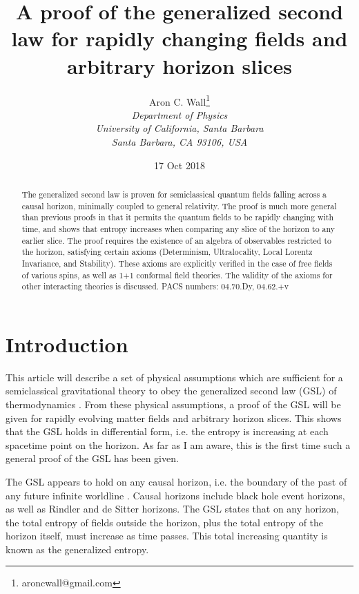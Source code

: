 \documentclass[12pt]{article}
\author{Aron C. Wall\footnote{aroncwall@gmail.com}
\\ \textit{Department of Physics} \\ \textit{University of California, Santa Barbara}
\\ \textit{Santa Barbara, CA 93106, USA} }
\title{A proof of the generalized second law for rapidly changing fields and arbitrary horizon slices}
\date{17 Oct 2018}
\begin{document}
\maketitle

\begin{abstract}
The generalized second law is proven for semiclassical quantum fields falling across a causal horizon, minimally coupled to general relativity.  The proof is much more general than previous proofs in that it permits the quantum fields to be rapidly changing with time, and shows that entropy increases when comparing any slice of the horizon to any earlier slice.  The proof requires the existence of an algebra of observables restricted to the horizon, satisfying certain axioms (Determinism, Ultralocality, Local Lorentz Invariance, and Stability).  These axioms are explicitly verified in the case of free fields of various spins, as well as 1+1 conformal field theories.  The validity of the axioms for other interacting theories is discussed.
\newline\newline
PACS numbers: 04.70.Dy, 04.62.+v
\end{abstract}

\newpage
\tableofcontents
\newpage

\section{Introduction}

This article will describe a set of physical assumptions which are sufficient for a semiclassical gravitational theory to obey the generalized second law (GSL) of thermodynamics \cite{hawking75}.  From these physical assumptions, a proof of the GSL will be given for rapidly evolving matter fields and arbitrary horizon slices.  This shows that the GSL holds in differential form, i.e. the entropy is increasing at each spacetime point on the horizon.  As far as I am aware, this is the first time such a general proof of the GSL has been given.

The GSL appears to hold on any causal horizon, i.e. the boundary of the past of any future infinite worldline \cite{JP03}.  Causal horizons include black hole event horizons, as well as Rindler and de Sitter horizons.  The GSL states that on any horizon, the total entropy of fields outside the horizon, plus the total entropy of the horizon itself, must increase as time passes.  This total increasing quantity is known as the generalized entropy.
\end{document}
